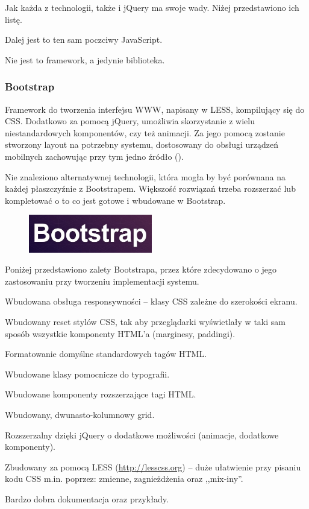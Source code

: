 Jak każda z technologii, także i jQuery ma swoje wady. Niżej przedstawiono ich listę.
\begin{packed_item}
    \item{Dalej jest to ten sam poczciwy JavaScript.}
    \item{Nie jest to framework, a jedynie biblioteka.}
\end{packed_item}

\newpage
\subsubsection{Bootstrap}
Framework do tworzenia interfejsu WWW, napisany w LESS, kompilujący się do CSS. Dodatkowo za pomocą jQuery, umożliwia skorzystanie z wielu niestandardowych komponentów, czy też animacji. Za jego pomocą zostanie stworzony layout na potrzebny systemu, dostosowany do obsługi urządzeń mobilnych zachowując przy tym jedno źródło (\cite{bootstrap}).

Nie znaleziono alternatywnej technologii, która mogła by być porównana na każdej płaszczyźnie z Bootstrapem. Większość rozwiązań trzeba rozszerzać lub kompletować o to co jest gotowe i wbudowane w Bootstrap.

\begin{figure}
  \begin{center}
    \includegraphics[width=0.48\textwidth]{img/logos/bootstrap.jpg}
  \end{center}
\end{figure}

Poniżej przedstawiono zalety Bootstrapa, przez które zdecydowano o jego zastosowaniu przy tworzeniu implementacji systemu.
\begin{packed_item}
    \item{Wbudowana obsługa responsywności -- klasy CSS zależne do szerokości ekranu.}
    \item{Wbudowany reset stylów CSS, tak aby przeglądarki wyświetlały w taki sam sposób wszystkie komponenty HTML'a (marginesy, paddingi).}
    \item{Formatowanie domyślne standardowych tagów HTML.}
    \item{Wbudowane klasy pomocnicze do typografii.}
    \item{Wbudowane komponenty rozszerzające tagi HTML.}
    \item{Wbudowany, dwunasto-kolumnowy grid.}
    \item{Rozszerzalny dzięki jQuery o dodatkowe możliwości (animacje, dodatkowe komponenty).}
    \item{Zbudowany za pomocą LESS (\url{http://lesscss.org}) -- duże ułatwienie przy pisaniu kodu CSS m.in. poprzez: zmienne, zagnieżdżenia oraz ,,mix-iny''.}
    \item{Bardzo dobra dokumentacja oraz przykłady.}
\end{packed_item}

